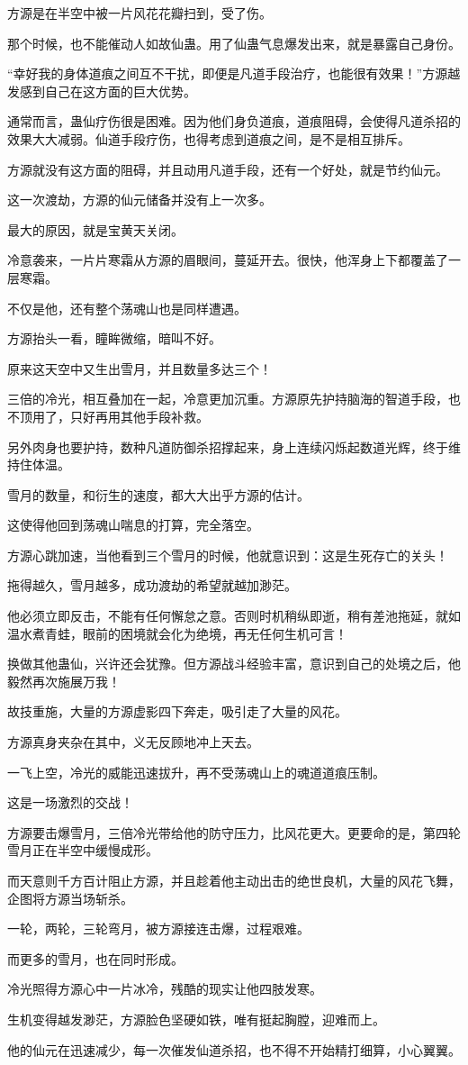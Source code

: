 \begin{this_body}
方源是在半空中被一片风花花瓣扫到，受了伤。

那个时候，也不能催动人如故仙蛊。用了仙蛊气息爆发出来，就是暴露自己身份。

“幸好我的身体道痕之间互不干扰，即便是凡道手段治疗，也能很有效果！”方源越发感到自己在这方面的巨大优势。

通常而言，蛊仙疗伤很是困难。因为他们身负道痕，道痕阻碍，会使得凡道杀招的效果大大减弱。仙道手段疗伤，也得考虑到道痕之间，是不是相互排斥。

方源就没有这方面的阻碍，并且动用凡道手段，还有一个好处，就是节约仙元。

这一次渡劫，方源的仙元储备并没有上一次多。

最大的原因，就是宝黄天关闭。

冷意袭来，一片片寒霜从方源的眉眼间，蔓延开去。很快，他浑身上下都覆盖了一层寒霜。

不仅是他，还有整个荡魂山也是同样遭遇。

方源抬头一看，瞳眸微缩，暗叫不好。

原来这天空中又生出雪月，并且数量多达三个！

三倍的冷光，相互叠加在一起，冷意更加沉重。方源原先护持脑海的智道手段，也不顶用了，只好再用其他手段补救。

另外肉身也要护持，数种凡道防御杀招撑起来，身上连续闪烁起数道光辉，终于维持住体温。

雪月的数量，和衍生的速度，都大大出乎方源的估计。

这使得他回到荡魂山喘息的打算，完全落空。

方源心跳加速，当他看到三个雪月的时候，他就意识到：这是生死存亡的关头！

拖得越久，雪月越多，成功渡劫的希望就越加渺茫。

他必须立即反击，不能有任何懈怠之意。否则时机稍纵即逝，稍有差池拖延，就如温水煮青蛙，眼前的困境就会化为绝境，再无任何生机可言！

换做其他蛊仙，兴许还会犹豫。但方源战斗经验丰富，意识到自己的处境之后，他毅然再次施展万我！

故技重施，大量的方源虚影四下奔走，吸引走了大量的风花。

方源真身夹杂在其中，义无反顾地冲上天去。

一飞上空，冷光的威能迅速拔升，再不受荡魂山上的魂道道痕压制。

这是一场激烈的交战！

方源要击爆雪月，三倍冷光带给他的防守压力，比风花更大。更要命的是，第四轮雪月正在半空中缓慢成形。

而天意则千方百计阻止方源，并且趁着他主动出击的绝世良机，大量的风花飞舞，企图将方源当场斩杀。

一轮，两轮，三轮弯月，被方源接连击爆，过程艰难。

而更多的雪月，也在同时形成。

冷光照得方源心中一片冰冷，残酷的现实让他四肢发寒。

生机变得越发渺茫，方源脸色坚硬如铁，唯有挺起胸膛，迎难而上。

他的仙元在迅速减少，每一次催发仙道杀招，也不得不开始精打细算，小心翼翼。

\end{this_body}

